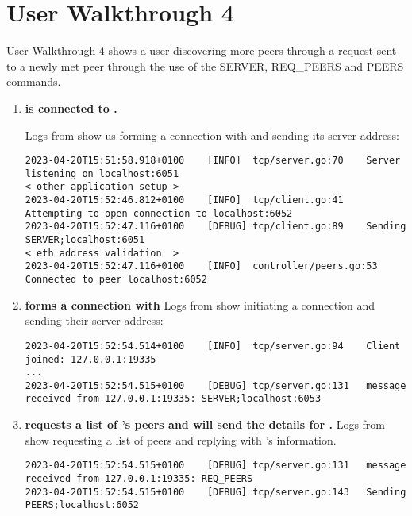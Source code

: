 
\section*{User Walkthrough 4}

User Walkthrough 4 shows a user discovering more peers through a request sent to a newly met peer through the use of the SERVER, REQ\_PEERS and PEERS commands.

\begin{enumerate}[itemsep=2.5pt]

  \item \textbf{ is connected to .}
  
  Logs from  show us forming a connection with  and sending its server address:

\begin{lstlisting}[breaklines=true, postbreak=\mbox{\textcolor{red}{$\hookrightarrow$}\space}]
2023-04-20T15:51:58.918+0100	[INFO]	tcp/server.go:70	Server listening on localhost:6051
< other application setup >
2023-04-20T15:52:46.812+0100	[INFO]	tcp/client.go:41	Attempting to open connection to localhost:6052
2023-04-20T15:52:47.116+0100	[DEBUG]	tcp/client.go:89	Sending SERVER;localhost:6051
< eth address validation  > 
2023-04-20T15:52:47.116+0100	[INFO]	controller/peers.go:53	Connected to peer localhost:6052
\end{lstlisting}

  \item \textbf{ forms a connection with }
  Logs from  show  initiating a connection and sending their server address:

\begin{lstlisting}[breaklines=true, postbreak=\mbox{\textcolor{red}{$\hookrightarrow$}\space}]
2023-04-20T15:52:54.514+0100	[INFO]	tcp/server.go:94	Client joined: 127.0.0.1:19335
...
2023-04-20T15:52:54.515+0100	[DEBUG]	tcp/server.go:131	message received from 127.0.0.1:19335: SERVER;localhost:6053
\end{lstlisting}

  \item \textbf{ requests a list of 's peers and  will send the details for .}
  Logs from  show  requesting a list of peers and  replying with 's information.

\begin{lstlisting}[breaklines=true, postbreak=\mbox{\textcolor{red}{$\hookrightarrow$}\space}]
2023-04-20T15:52:54.515+0100	[DEBUG]	tcp/server.go:131	message received from 127.0.0.1:19335: REQ_PEERS
2023-04-20T15:52:54.515+0100	[DEBUG]	tcp/server.go:143	Sending PEERS;localhost:6052
\end{lstlisting}


\end{enumerate}
